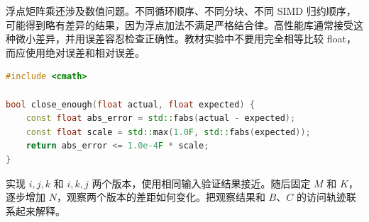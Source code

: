 浮点矩阵乘还涉及数值问题。不同循环顺序、不同分块、不同 SIMD 归约顺序，可能得到略有差异的结果，因为浮点加法不满足严格结合律。高性能库通常接受这种微小差异，并用误差容忍检查正确性。教材实验中不要用完全相等比较 float，而应使用绝对误差和相对误差。

\begin{lstlisting}[language=C++,caption={浮点结果检查：同时看绝对误差和相对误差}]
#include <cmath>

bool close_enough(float actual, float expected) {
    const float abs_error = std::fabs(actual - expected);
    const float scale = std::max(1.0F, std::fabs(expected));
    return abs_error <= 1.0e-4F * scale;
}
\end{lstlisting}

\begin{exercisebox}
实现 $i,j,k$ 和 $i,k,j$ 两个版本，使用相同输入验证结果接近。随后固定 $M$ 和 $K$，逐步增加 $N$，观察两个版本的差距如何变化。把观察结果和 $B$、$C$ 的访问轨迹联系起来解释。
\end{exercisebox}
